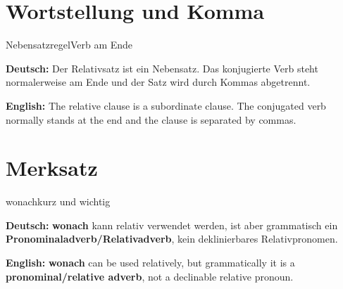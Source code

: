 \documentclass[a4paper,11pt]{article}
\newcommand{\GermanText}[1]{\textbf{Deutsch: }#1\par}
\newcommand{\EnglishText}[1]{{\small\color{SoftGray}\textbf{English: }#1\par}}
\begin{document}
\section{Wortstellung und Komma}

\begin{grammarentry}{Nebensatzregel}{Verb am Ende}

\GermanText{Der Relativsatz ist ein Nebensatz. Das konjugierte Verb steht normalerweise am Ende und der Satz wird durch Kommas abgetrennt.}

\EnglishText{The relative clause is a subordinate clause. The conjugated verb normally stands at the end and the clause is separated by commas.}

\end{grammarentry}

\section{Merksatz}

\begin{grammarentry}{wonach}{kurz und wichtig}

\GermanText{\textbf{wonach} kann relativ verwendet werden, ist aber grammatisch ein \textbf{Pronominaladverb/Relativadverb}, kein deklinierbares Relativpronomen.}

\EnglishText{\textbf{wonach} can be used relatively, but grammatically it is a \textbf{pronominal/relative adverb}, not a declinable relative pronoun.}

\end{grammarentry}
\end{document}
